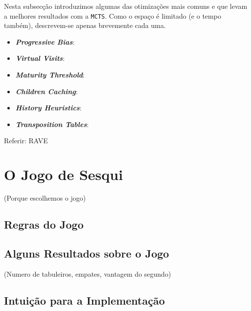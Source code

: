 \documentclass[12pt,a4paper,oneside]{article}
\begin{document}
Nesta subsecção introduzimos algumas das otimizações mais comuns e que
levam a melhores resultados com a \texttt{MCTS}. Como o espaço é
limitado (e o tempo também), descrevem-se apenas brevemente cada uma.

\begin{itemize}
\item \textbf{\textit{Progressive Bias}}:
\item \textbf{\textit{Virtual Visits}}:
\item \textbf{\textit{Maturity Threshold}}:
\item \textbf{\textit{Children Caching}}:
\item \textbf{\textit{History Heuristics}}:
\item \textbf{\textit{Transposition Tables}}:
\end{itemize}

Referir: RAVE



\section{O Jogo de Sesqui}
\label{sec:sesqui}

(Porque escolhemos o jogo)

\lipsum[1]

\subsection{Regras do Jogo}

\lipsum[1]

\lipsum[2]

\lipsum[3]

\subsection{Alguns Resultados sobre o Jogo}

(Numero de tabuleiros, empates, vantagem do segundo)

\lipsum[1]

\lipsum[2]

\subsection{Intuição para a Implementação}
\end{document}
